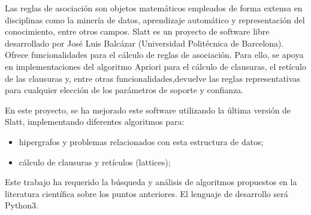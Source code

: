 Las reglas de asociación son objetos matemáticos empleados de forma extensa en disciplinas como la minería de datos, aprendizaje automático y representación del conocimiento, entre otros campos.
Slatt es un proyecto de software libre desarrollado por José Luis Balcázar (Universidad Politécnica de Barcelona). Ofrece funcionalidades para el cálculo de reglas de asociación. Para ello, se apoya en implementaciones del algoritmo Apriori para el cálculo de clausuras, el retículo de las clausuras y, entre otras
funcionalidades,devuelve las reglas representativas para cualquier elección de los parámetros de soporte y confianza.

En este proyecto, se ha mejorado este software utilizando la última versión de Slatt, implementando diferentes algoritmos para:

\begin{itemize}
    \item hipergrafos y problemas relacionados con esta estructura de datos;
    
    \item cálculo de clausuras y retículos (lattices);
\end{itemize}


Este trabajo ha requerido la búsqueda y análisis de algoritmos propuestos en la literatura científica sobre los puntos anteriores.
El lenguaje de desarrollo será Python3.
%
%



